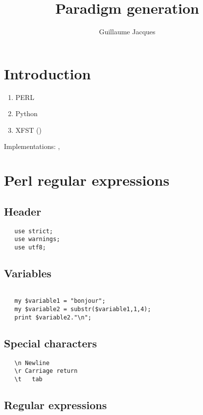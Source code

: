 \documentclass[oldfontcommands,oneside,a4paper,11pt]{article}
\begin{document}
 

\title{Paradigm generation}
\author{Guillaume Jacques}
\maketitle
\section{Introduction}
\begin{enumerate}
\item PERL
\item Python
\item XFST (\citealt{bessley03fsm})
\end{enumerate}

Implementations: \citet{jacques12khaling}, \citet{walther14compactness}





\section{Perl regular expressions}


\subsection{Header}
\begin{verbatim}
   use strict;
   use warnings;
   use utf8;
\end{verbatim}

\subsection{Variables}

\begin{verbatim}

   my $variable1 = "bonjour";
   my $variable2 = substr($variable1,1,4);
   print $variable2."\n";

\end{verbatim}

\subsection{Special characters}
\begin{verbatim}
   \n Newline
   \r Carriage return
   \t	tab 
\end{verbatim}

\subsection{Regular expressions}
\end{document}
